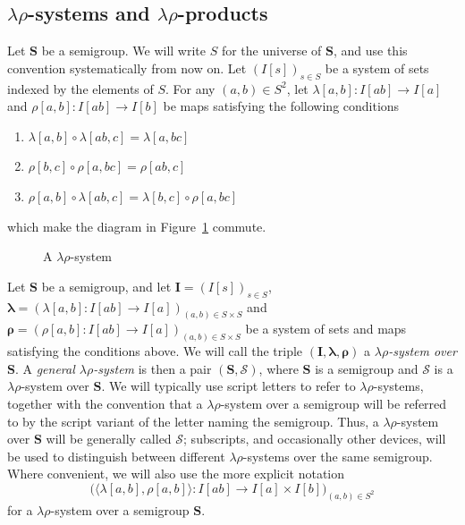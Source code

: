 \documentclass{amsart}
\newcommand{\blambda}{\boldsymbol{\lambda}}
\newcommand{\brho}{\boldsymbol{\rho}}
\begin{document}
\subsection{$\lambda\rho$-systems and $\lambda\rho$-products}

Let $\mathbf{S}$ be a semigroup. We will write $S$ for the universe of
$\mathbf{S}$, and use this convention systematically from now on. Let 
$(I[s])_{s\in S}$ be a system of sets indexed by the elements of $S$.
For any $(a,b)\in S^2$, let 
$\lambda[a,b]\colon I[ab]\to I[a]$ and $\rho[a,b]\colon I[ab]\to I[b]$
be maps satisfying the following conditions
\begin{enumerate}
\item[($\alpha$)] $\lambda[a,b]\circ\lambda[ab,c] = \lambda[a,bc]$
\item[($\beta$)] $\rho[b,c]\circ\rho[a,bc] = \rho[ab,c]$
\item[($\gamma$)] $\rho[a,b]\circ\lambda[ab,c] = \lambda[b,c]\circ\rho[a,bc]$
\end{enumerate}
which make the diagram in Figure~\ref{l-r-system} commute. 
\begin{figure}
\caption{A $\lambda\rho$-system}
\label{l-r-system}
\end{figure}
Let $\mathbf{S}$ be a semigroup, and let $\mathbf{I} =  (I[s])_{s\in S}$,
$\blambda = (\lambda[a,b]\colon I[ab]\to I[a])_{(a,b)\in S\times S}$ and
$\brho = (\rho[a,b]\colon I[ab]\to I[a])_{(a,b)\in S\times S}$
be a system of sets and maps satisfying the conditions above. 
We will call the triple $(\mathbf{I},\blambda,\brho)$ 
a \emph{$\lambda\rho$-system over} $\mathbf{S}$. A \emph{general
$\lambda\rho$-system} is then a pair $(\mathbf{S},\mathcal{S})$,
where $\mathbf{S}$ is a semigroup and $\mathcal{S}$
is a $\lambda\rho$-system over $\mathbf{S}$. 
We will typically use script letters to refer to $\lambda\rho$-systems,
together with the convention that a $\lambda\rho$-system over a semigroup will
be referred to by the script variant of the letter naming the semigroup.
Thus, a $\lambda\rho$-system over $\mathbf{S}$ will be generally called
$\mathcal{S}$; subscripts, and occasionally other devices, will be used to
distinguish between different  
$\lambda\rho$-systems over the same semigroup.
Where convenient, we will also use the more explicit notation
$$
\bigl(\langle \lambda[a,b],\rho[a,b]\rangle\colon
I[ab]\longrightarrow I[a]\times I[b]\bigr)_{(a,b)\in S^2}
$$
for a $\lambda\rho$-system over a semigroup $\mathbf{S}$.
\end{document}
